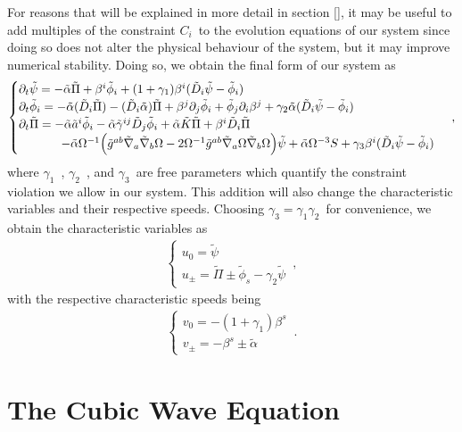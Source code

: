For reasons that will be explained in more detail in section \ref{}, it may be useful to add multiples of the constraint $C_i$~to the evolution equations of our system since doing so does not alter the physical behaviour of the system, but it may improve numerical stability. Doing so, we obtain the final form of our system as
%
\begin{align}
    \begin{cases}
        \partial_t \tilde{\psi} = - \tilde{\alpha} \tilde{\Pi} + \beta^i \tilde{\phi}_i + (1 + \gamma_1) \beta^i (\tilde{D}_i \tilde{\psi} - \tilde{\phi}_i) \\
        \partial_t \tilde{\phi}_i = - \tilde{\alpha} (\tilde{D}_i \tilde{\Pi}) - (\tilde{D}_i \tilde{\alpha}) \tilde{\Pi} + \beta^j \partial_j \tilde{\phi}_i + \tilde{\phi}_j \partial_i \beta^j + \gamma_2 \tilde{\alpha} (\tilde{D}_i \tilde{\psi} - \tilde{\phi}_i) \\
        \partial_t \tilde{\Pi} = - \tilde{\alpha} \tilde{a}^i \tilde{\phi}_i - \tilde{\alpha} \tilde{\gamma}^{ij} \tilde{D}_j \tilde{\phi}_i + \tilde{\alpha} \tilde{K} \tilde{\Pi} + \beta^i \tilde{D}_i \tilde{\Pi} \\
        \hspace{3.5em} - \tilde{\alpha} \Omega^{-1} \Big( \tilde{g}^{ab} \tilde{\nabla}_a \tilde{\nabla}_b \Omega - 2 \Omega^{-1} \tilde{g}^{ab} \tilde{\nabla}_a \Omega \tilde{\nabla}_b \Omega \Big) \tilde{\psi} + \tilde{\alpha} \Omega^{-3} S + \gamma_3 \beta^i (\tilde{D}_i \tilde{\psi} - \tilde{\phi}_i)
    \end{cases}\,,
\end{align}
%
where $\gamma_1$~, $\gamma_2$~, and $\gamma_3$~are free parameters which quantify the constraint violation we allow in our system. This addition will also change the characteristic variables and their respective speeds. Choosing $\gamma_3 = \gamma_1 \gamma_2$~for convenience, we obtain the characteristic variables as
%
\begin{align}
    \begin{cases}
 u_0 = \tilde{\psi} \\
 u_\pm = \tilde{\Pi} \pm \tilde{\phi}_s - \gamma_2 \tilde{\psi}
            \end{cases}\,,
\end{align}
%
with the respective characteristic speeds being
%
\begin{align}
    \begin{cases}
 v_0 = - (1 + \gamma_1) \beta^s \\
 v_\pm = -\beta^s \pm \tilde{\alpha}
            \end{cases}\,.
\end{align}


\section{The Cubic Wave Equation}
\label{section:cubic_wave_equation}